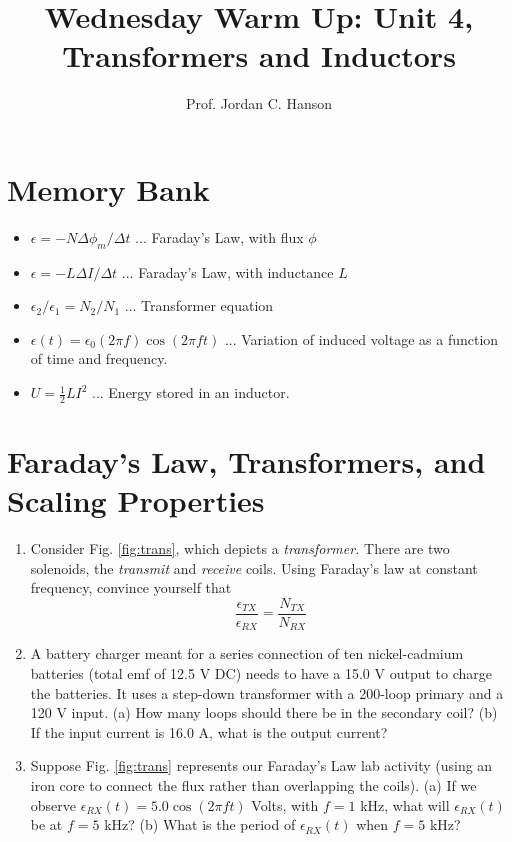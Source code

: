 \documentclass{article}
\begin{document}
\twocolumn

\title{Wednesday Warm Up: Unit 4, Transformers and Inductors}
\author{Prof. Jordan C. Hanson}

\maketitle

\section{Memory Bank}

\begin{itemize}
\item $\epsilon = -N \Delta \phi_m /\Delta t$ ... Faraday's Law, with flux $\phi$
\item $\epsilon = -L \Delta I/\Delta t$ ... Faraday's Law, with inductance $L$
\item $\epsilon_2/\epsilon_1 = N_2/N_1$ ... Transformer equation
\item $\epsilon(t) = \epsilon_0 (2 \pi f) \cos(2\pi ft)$ ... Variation of induced voltage as a function of time and frequency.
\item $U = \frac{1}{2}LI^2$ ... Energy stored in an inductor.
\end{itemize}

\section{Faraday's Law, Transformers, and Scaling Properties}

\begin{enumerate}
\item Consider Fig. \ref{fig:trans}, which depicts a \textit{transformer.}  There are two solenoids, the \textit{transmit} and \textit{receive} coils.  Using Faraday's law at constant frequency, convince yourself that
\begin{equation}
\frac{\epsilon_{TX}}{\epsilon_{RX}} = \frac{N_{TX}}{N_{RX}}
\end{equation}
\item A battery charger meant for a series connection of ten nickel-cadmium batteries (total emf of 12.5 V DC) needs to have a 15.0 V output to charge the batteries. It uses a step-down transformer with a 200-loop primary and a 120 V input. (a) How many loops should there be in the secondary coil? (b) If the input current is 16.0 A, what is the output current? \\ \vspace{4cm}
\item Suppose Fig. \ref{fig:trans} represents our Faraday's Law lab activity (using an iron core to connect the flux rather than overlapping the coils).  (a) If we observe $\epsilon_{RX}(t) = 5.0\cos(2\pi ft)$ Volts, with $f = 1$ kHz, what will $\epsilon_{RX}(t)$ be at $f = 5$ kHz? (b) What is the period of $\epsilon_{RX}(t)$ when $f = 5$ kHz? \\ \vspace{4cm}
\end{enumerate}
\end{document}
